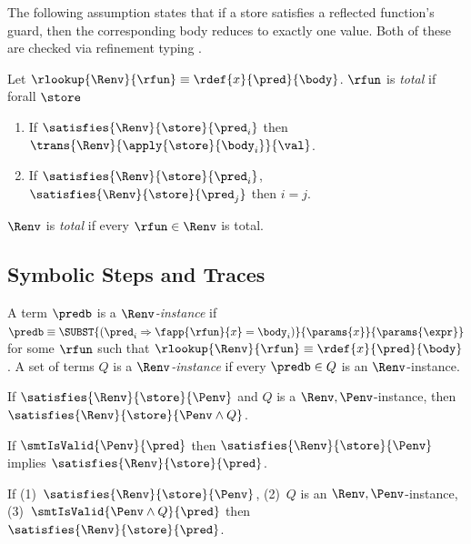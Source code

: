 %
The following assumption states that
if a store satisfies a reflected function's
guard, then the corresponding body reduces
to exactly one value.
%
Both of these are checked via
refinement typing \cite{Vazou14}.
%

\begin{lemma}\label{asm:total}
Let $\rlookup{\Renv}{\rfun} \equiv \rdef{x}{\pred}{\body}$.
%
$\rfun$ is \emph{total} if forall $\store$
%
\begin{enumerate}
\item If $\satisfies{\Renv}{\store}{\pred_i}$ then $\trans{\Renv}{\apply{\store}{\body_i}}{\val}$.
\item If $\satisfies{\Renv}{\store}{\pred_i}$, $\satisfies{\Renv}{\store}{\pred_j}$ then $i=j$.
\end{enumerate}
%
$\Renv$ is \emph{total} if every $\rfun \in \Renv$ is total.
%
\end{lemma}

\subsection{Symbolic Steps and Traces} \label{sec:pbe:trace}

%
A term $\predb$ is a \emph{$\Renv$-instance} if
${\predb \equiv \SUBST{(\pred_i \Rightarrow \fapp{\rfun}{x} = \body_i)}{\params{x}}{\params{\expr}}}$
for some $\rfun$ such that $\rlookup{\Renv}{\rfun} \equiv \rdef{x}{\pred}{\body}$.
%
A set of terms $Q$ is a \emph{$\Renv$-instance}
if every $\predb \in Q$ is an $\Renv$-instance.

\begin{lemma}\label{lem:sat-inst}
  If   $\satisfies{\Renv}{\store}{\Penv}$ and
       $Q$ is a $\Renv,\Penv$-instance,
  then $\satisfies{\Renv}{\store}{\Penv \wedge Q}$.
\end{lemma}

\begin{lemma} \label{lem:smt-approx}
If $\smtIsValid{\Penv}{\pred}$ then %
   $\satisfies{\Renv}{\store}{\Penv}$ implies
   $\satisfies{\Renv}{\store}{\pred}$.
\end{lemma}

\begin{lemma} \label{lem:smt-inst}
If   (1)~$\satisfies{\Renv}{\store}{\Penv}$,
     (2)~$Q$ is an $\Renv,\Penv$-instance,
     (3)~$\smtIsValid{\Penv \wedge Q}{\pred}$
then $\satisfies{\Renv}{\store}{\pred}$.
\end{lemma}


